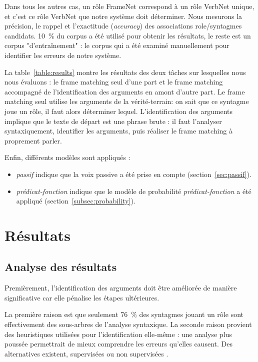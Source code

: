 Dans tous les autres cas, un rôle FrameNet correspond à un rôle VerbNet unique,
et c'est ce rôle VerbNet que notre système doit déterminer. Nous mesurons la
précision, le rappel et l'exactitude (\emph{accuracy}) des associations
role/syntagmes candidats. 10~\% du corpus a été utilisé pour obtenir les
résultats, le reste est un corpus "d'entraînement" : le corpus qui a été
examiné manuellement pour identifier les erreurs de notre système.

La table~\ref{table:results} montre les résultats des deux tâches sur
lesquelles nous nous évaluons : le frame matching seul d'une part et le frame
matching accompagné de l'identification des arguments en amont d'autre part. Le
frame matching seul utilise les arguments de la vérité-terrain: on sait que ce
syntagme joue un rôle, il faut alors déterminer lequel. L'identification des
arguments implique que le texte de départ est une phrase brute : il faut
l'analyser syntaxiquement, identifier les arguments, puis réaliser le frame
matching à proprement parler.

Enfin, différents modèles sont appliqués :

\begin{itemize}

    \item \emph{passif} indique que la voix passive a été prise en compte
    (section~\ref{sec:passif}).

    \item \emph{prédicat-fonction} indique que le modèle de probabilité
    \emph{prédicat-fonction} a été appliqué (section~\ref{subsec:probability}).

\end{itemize}

\section{Résultats}

\subsection{Analyse des résultats}

Premièrement, l'identification des arguments doit être améliorée de manière
significative car elle pénalise les étapes ultérieures.

La première raison est que seulement 76~\% des syntagmes jouant un rôle sont
effectivement des sous-arbres de l'analyse syntaxique.
La seconde raison provient des heuristiques utilisées pour l'identification
elle-même : une analyse plus poussée permettrait de mieux comprendre les
erreurs qu'elles causent. Des alternatives existent, supervisées ou non
supervisées \citep{abend2009unsupervised}.

